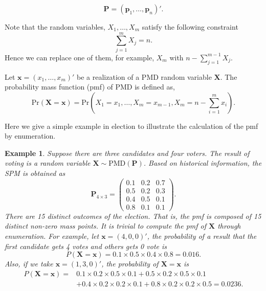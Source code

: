 \documentclass[12pt]{article}
\newcommand{\Xmat}{\mathbf{X}}
\newcommand{\Pmat}{\mathbf{P}}
\newcommand{\pvec}{\boldsymbol{p}}
\newcommand{\PMD}{\textrm{PMD}}
\newcommand{\xvec}{\boldsymbol{x}}
\newcommand{\qedw}{\hfill \ensuremath{\Box}}
\newtheorem{example}{Example}
\begin{document}

\begin{equation*}
\Pmat = (\pvec_{1}, \dots, \pvec_{n} )'.
\end{equation*}

Note that the random variables, $X_1, \dots, X_{m}$ satisfy the following constraint $$\sum_{j=1}^{m}X_{j} = n.$$ Hence we can replace one of them, for example, $X_m$ with $n-\sum_{j=1}^{m-1}X_j$.

Let $\xvec = (x_1,\dots,x_m)'$ be a realization of a $\PMD$ random variable $\Xmat$. The probability mass function (pmf) of PMD is defined as,
$$\text{Pr}(\Xmat=\xvec) = \text{Pr} \left( X_1 = x_1, \dots, X_m = x_{m-1}, X_{m} = n-\sum_{i=1}^{m}x_i \right).$$

Here we give a simple example in election to illustrate the calculation of the pmf by enumeration.
\begin{example}%
Suppose there are three candidates and four voters. The result of voting is a random variable $\Xmat \sim \PMD(\Pmat)$. Based on historical information, the SPM is obtained as 
\begin{equation*}
\Pmat_{4 \times 3} = \begin{pmatrix}
0.1 &  0.2 & 0.7\\
0.5 & 0.2 & 0.3\\
0.4 &  0.5 & 0.1\\
0.8 & 0.1 & 0.1
\end{pmatrix}.
\end{equation*}
There are 15 distinct outcomes of the election. That is, the pmf is composed of 15 distinct non-zero mass points. It is trivial to compute the pmf of $\Xmat$ through enumeration. For example, let $\xvec =  (4,0,0)'$, the probability of a result that the first candidate gets 4 votes and others gets 0 vote is
\begin{equation*}
P\left( \Xmat = \xvec \right) = 0.1\times 0.5 \times 0.4 \times 0.8 = 0.016.
\end{equation*}
Also, if we take $\xvec=(1,3,0)'$, the probability of $\Xmat = \xvec$ is
\begin{align*}
P\left( \Xmat = \xvec \right)  =  & 0.1\times 0.2 \times 0.5 \times 0.1 +
 0.5\times0.2\times0.5 \times 0.1 \\
 & + 0.4\times0.2\times0.2\times0.1 + 0.8\times0.2\times0.2\times0.5 = 0.0236.
\end{align*}
\end{example}
\end{document}
